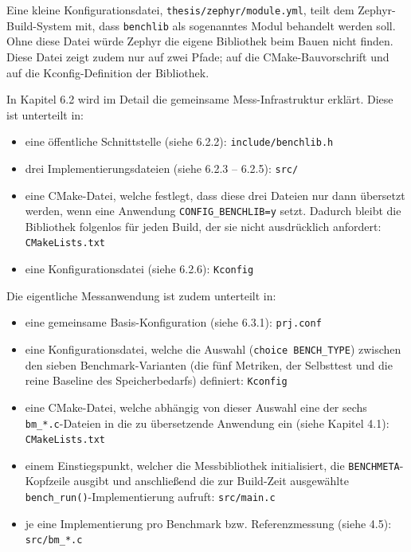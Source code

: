 Eine kleine Konfigurationsdatei, \lstinline[style=fileinline]|thesis/zephyr/module.yml|, teilt dem Zephyr-Build-System mit, dass \lstinline[style=fileinline]|benchlib| als sogenanntes Modul behandelt werden soll. Ohne diese Datei würde Zephyr die eigene Bibliothek beim Bauen nicht finden. Diese Datei zeigt zudem nur auf zwei Pfade; auf die CMake-Bauvorschrift und auf die Kconfig-Definition der Bibliothek.

In Kapitel 6.2 wird im Detail die gemeinsame Mess-Infrastruktur erklärt. Diese ist unterteilt in:

\begin{itemize}
\item eine öffentliche Schnittstelle (siehe 6.2.2): \lstinline[style=fileinline]|include/benchlib.h|
\item drei Implementierungsdateien (siehe 6.2.3 – 6.2.5): \lstinline[style=fileinline]|src/|
\item eine CMake-Datei, welche festlegt, dass diese drei Dateien nur dann übersetzt werden, wenn eine Anwendung \lstinline[style=fileinline]|CONFIG_BENCHLIB=y| setzt. Dadurch bleibt die Bibliothek folgenlos für jeden Build, der sie nicht ausdrücklich anfordert: \lstinline[style=fileinline]|CMakeLists.txt|
\item eine Konfigurationsdatei (siehe 6.2.6): \lstinline[style=fileinline]|Kconfig|
\end{itemize}
Die eigentliche Messanwendung ist zudem unterteilt in:

\begin{itemize}
\item eine gemeinsame Basis-Konfiguration (siehe 6.3.1): \lstinline[style=fileinline]|prj.conf|
\item eine Konfigurationsdatei, welche die Auswahl (\lstinline[style=fileinline]|choice BENCH_TYPE|) zwischen den sieben Benchmark-Varianten (die fünf Metriken, der Selbsttest und die reine Baseline des Speicherbedarfs) definiert: \lstinline[style=fileinline]|Kconfig|
\item eine CMake-Datei, welche abhängig von dieser Auswahl eine der sechs \lstinline[style=fileinline]|bm_*.c|-Dateien in die zu übersetzende Anwendung ein (siehe Kapitel 4.1): \lstinline[style=fileinline]|CMakeLists.txt|
\item einem Einstiegspunkt, welcher die Messbibliothek initialisiert, die \lstinline[style=fileinline]|BENCHMETA|-Kopfzeile ausgibt und anschließend die zur Build-Zeit ausgewählte \lstinline[style=fileinline]|bench_run()|-Implementierung aufruft: \lstinline[style=fileinline]|src/main.c|
\item je eine Implementierung pro Benchmark bzw. Referenzmessung (siehe 4.5): \lstinline[style=fileinline]|src/bm_*.c|
\end{itemize}
